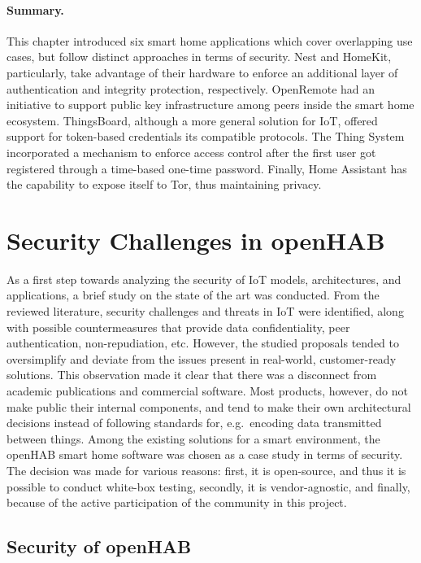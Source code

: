 \documentclass[12pt]{article}
\begin{document}
\paragraph{Summary.} This chapter introduced six smart home applications which cover overlapping use cases, but follow distinct approaches in terms of security. Nest and HomeKit, particularly, take advantage of their hardware to enforce an additional layer of authentication and integrity protection, respectively. OpenRemote had an initiative to support public key infrastructure among peers inside the smart home ecosystem. ThingsBoard, although a more general solution for IoT, offered support for token-based credentials its compatible protocols. The Thing System incorporated a mechanism to enforce access control after the first user got registered through a time-based one-time password. Finally, Home Assistant has the capability to expose itself to Tor, thus maintaining privacy. 

\newpage
\section{Security Challenges in openHAB}
\label{sec:method}

As a first step towards analyzing the security of IoT models, architectures, and applications, a brief study on the state of the art was conducted. From the reviewed literature, security challenges and threats in IoT were identified, along with possible countermeasures that provide data confidentiality, peer authentication, non-repudiation, etc. However, the studied proposals tended to oversimplify and deviate from the issues present in real-world, customer-ready solutions. This observation made it clear that there was a disconnect from academic publications and commercial software. Most products, however, do not make public their internal components, and tend to make their own architectural decisions instead of following standards for, e.g.\ encoding data transmitted between things. Among the existing solutions for a smart environment, the openHAB smart home software was chosen as a case study in terms of security. The decision was made for various reasons: first, it is open-source, and thus it is possible to conduct white-box testing, secondly, it is vendor-agnostic, and finally, because of the active participation of the community in this project.

\subsection{Security of openHAB}
\end{document}
